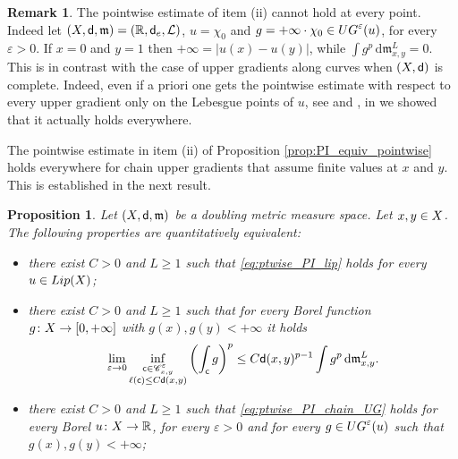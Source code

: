 \documentclass[12pt]{amsart}
\newcommand{\R}{\mathbb{R}}
\newcommand{\sfd}{{\sf d}}
\renewcommand{\d}{{\mathrm d}}
\newcommand{\X}{{\rm X}}
\newcommand{\Lip}{{\rm Lip}}
\newcommand{\mm}{\mathfrak m}
\newtheorem{proposition}[theorem]{Proposition}
\theoremstyle{definition}
\newtheorem{remark}[theorem]{Remark}
\newcommand{\sfc}{{\sf c}}
\newcommand{\Chain}[1]{\mathscr{C}^{#1}}
\newcommand{\UG}[1]{{\rm UG}^{#1}}
\begin{document}
%
\begin{remark}
    The pointwise estimate of item (ii) cannot hold at every point. Indeed let $(\X,\sfd,\mm) = (\R,\sfd_e,\mathcal{L})$, $u=\chi_{0}$ and $g=+\infty\cdot\chi_0 \in \UG{\varepsilon}(u)$, for every $\varepsilon > 0$. If $x=0$ and $y = 1$ then $+\infty = \vert u(x)-u(y)\vert$, while $\int g^p\,\d\mm_{x,y}^L = 0$. This is in contrast with the case of upper gradients along curves when $(\X,\sfd)$ is complete. Indeed, even if a priori one gets the pointwise estimate with respect to every upper gradient only on the Lebesgue points of $u$, see \cite[Theorem 9.5]{Hei01} and \cite[Theorem 8.1.7]{HKST15}, in \cite[Theorem A.3]{CaputoCavallucci2024II} we showed that it actually holds everywhere.
\end{remark}
%
The pointwise estimate in item (ii) of Proposition \ref{prop:PI_equiv_pointwise} holds everywhere for chain upper gradients that assume finite values at $x$ and $y$. This is established in the next result.
%
\begin{proposition}
\label{prop:pt_PI_equivalent_conditions_A_p_connectedness}
    Let $(\X,\sfd,\mm)$ be a doubling metric measure space. Let $x,y\in \X$. The following properties are quantitatively equivalent:
    \begin{itemize}
        \item[(i)] there exist $C >0$ and $L\ge 1$ such that \eqref{eq:ptwise_PI_lip} holds for every $u\in \Lip(\X)$;
        \item[(ii)] there exist $C>0$ and $L\ge 1$ such that for every Borel function $g\colon \X\to [0,+\infty]$ with $g(x),g(y) < +\infty$ it holds
       \begin{equation}
        \label{eq:A_p-connectedness-limit}
            \lim_{\varepsilon \to 0} \inf_{\substack{\sfc \in \Chain{\varepsilon}_{x,y}\\ \ell(\sfc) \le C\sfd(x,y)}} \left(\int_{\sfc} g\right)^p \le C\sfd(x,y)^{p-1}\int g^p\,\d\mm_{x,y}^L.
        \end{equation}
        \item[(iii)] there exist $C >0$ and $L\ge 1$ such that \eqref{eq:ptwise_PI_chain_UG} holds for every Borel $u\colon \X \to \R$, for every $\varepsilon > 0$ and for every $g\in \UG{\varepsilon}(u)$ such that $g(x),g(y) < +\infty$;
    \end{itemize}
\end{proposition}
%
\end{document}
